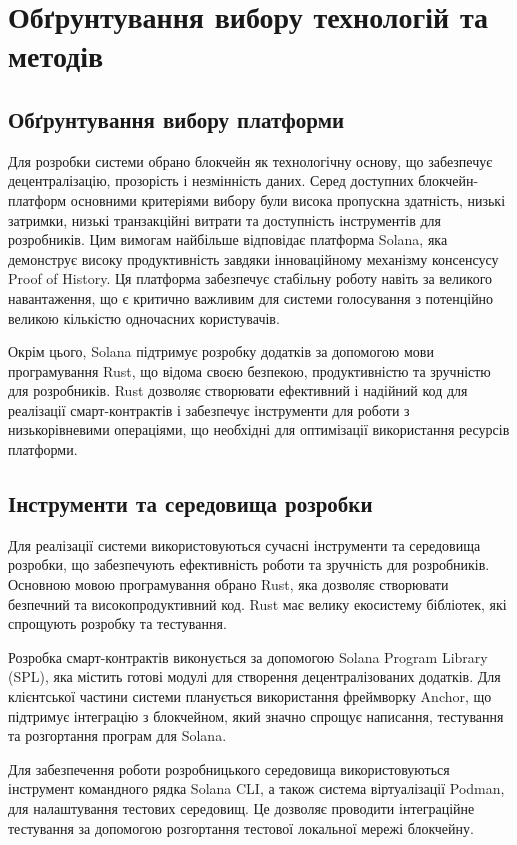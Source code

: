 \documentclass[14pt]{extreport}
\begin{document}
  \section{Обґрунтування вибору технологій та методів}
  \subsection{Обґрунтування вибору платформи}
  
  Для розробки системи обрано блокчейн як технологічну основу, що забезпечує децентралізацію, прозорість і незмінність даних. Серед доступних блокчейн-платформ основними критеріями вибору були висока пропускна здатність, низькі затримки, низькі транзакційні витрати та доступність інструментів для розробників. Цим вимогам найбільше відповідає платформа Solana, яка демонструє високу продуктивність завдяки інноваційному механізму консенсусу Proof of History. Ця платформа забезпечує стабільну роботу навіть за великого навантаження, що є критично важливим для системи голосування з потенційно великою кількістю одночасних користувачів.

  Окрім цього, Solana підтримує розробку додатків за допомогою мови програмування Rust, що відома своєю безпекою, продуктивністю та зручністю для розробників. Rust дозволяє створювати ефективний і надійний код для реалізації смарт-контрактів і забезпечує інструменти для роботи з низькорівневими операціями, що необхідні для оптимізації використання ресурсів платформи.
  
  \subsection{Інструменти та середовища розробки}
  
  Для реалізації системи використовуються сучасні інструменти та середовища розробки, що забезпечують ефективність роботи та зручність для розробників. Основною мовою програмування обрано Rust, яка дозволяє створювати безпечний та високопродуктивний код. Rust має велику екосистему бібліотек, які спрощують розробку та тестування.

  Розробка смарт-контрактів виконується за допомогою Solana Program Library (SPL), яка містить готові модулі для створення децентралізованих додатків. Для клієнтської частини системи планується використання фреймворку Anchor, що підтримує інтеграцію з блокчейном, який значно спрощує написання, тестування та розгортання програм для Solana.

  Для забезпечення роботи розробницького середовища використовуються інструмент командного рядка Solana CLI, а також система віртуалізації Podman, для налаштування тестових середовищ. Це дозволяє проводити інтеграційне тестування за допомогою розгортання тестової локальної мережі блокчейну.
\end{document}
